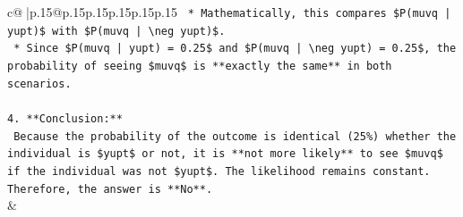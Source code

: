 \documentclass{article}
\begin{document}
{\begin{supertabular}{c@{$\;$}|p{.15\linewidth}@{}p{.15\linewidth}p{.15\linewidth}p{.15\linewidth}p{.15\linewidth}p{.15\linewidth}}
{{{\texttt{    *   Mathematically, this compares \$P(muvq | yupt)\$ with \$P(muvq | \textbackslash{}neg yupt)\$.} \\
\texttt{    *   Since \$P(muvq | yupt) = 0.25\$ and \$P(muvq | \textbackslash{}neg yupt) = 0.25\$, the probability of seeing \$muvq\$ is **exactly the same** in both scenarios.} \\
\\ 
\texttt{4.  **Conclusion:**} \\
\texttt{    Because the probability of the outcome is identical (25\%) whether the individual is \$yupt\$ or not, it is **not more likely** to see \$muvq\$ if the individual was not \$yupt\$. The likelihood remains constant. Therefore, the answer is **No**.} \\
            }
        }
    }
    & \\ \\


\end{supertabular}}
\end{document}
